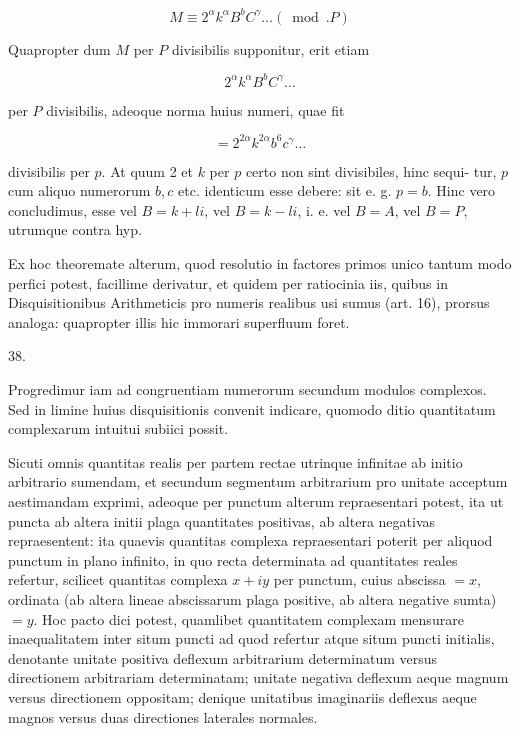 \documentclass[10pt]{article}
\begin{document}
\[
M \equiv 2^{\alpha} k^{\alpha} B^{b} C^{\gamma} \ldots(\bmod . P)
\]

Quapropter dum \(M\) per \(P\) divisibilis supponitur, erit etiam

\[
2^{\alpha} k^{\alpha} B^{b} C^{\gamma} \ldots
\]

per \(P\) divisibilis, adeoque norma huius numeri, quae fit

\[
=2^{2 \alpha} k^{2 \alpha} b^{6} c^{\gamma} \ldots
\]

divisibilis per \(p\). At quum 2 et \(k\) per \(p\) certo non sint divisibiles, hinc sequi-
tur, \(p\) cum aliquo numerorum \(b, c\) etc. identicum esse debere: sit e. g. \(p=b\). Hinc vero concludimus, esse vel \(B=k+l i\), vel \(B=k-l i\), i. e. vel \(B=A\), vel \(B=P\), utrumque contra hyp.

Ex hoc theoremate alterum, quod resolutio in factores primos unico tantum modo perfici potest, facillime derivatur, et quidem per ratiocinia iis, quibus in Disquisitionibus Arithmeticis pro numeris realibus usi sumus (art. 16), prorsus analoga: quapropter illis hic immorari superfluum foret.

38.

Progredimur iam ad congruentiam numerorum secundum modulos complexos. Sed in limine huius disquisitionis convenit indicare, quomodo ditio quantitatum complexarum intuitui subiici possit.

Sicuti omnis quantitas realis per partem rectae utrinque infinitae ab initio arbitrario sumendam, et secundum segmentum arbitrarium pro unitate acceptum aestimandam exprimi, adeoque per punctum alterum repraesentari potest, ita ut puncta ab altera initii plaga quantitates positivas, ab altera negativas repraesentent: ita quaevis quantitas complexa repraesentari poterit per aliquod punctum in plano infinito, in quo recta determinata ad quantitates reales refertur, scilicet quantitas complexa \(x+i y\) per punctum, cuius abscissa \(=x\), ordinata (ab altera lineae abscissarum plaga positive, ab altera negative sumta) \(=y\). Hoc pacto dici potest, quamlibet quantitatem complexam mensurare inaequalitatem inter situm puncti ad quod refertur atque situm puncti initialis, denotante unitate positiva deflexum arbitrarium determinatum versus directionem arbitrariam determinatam; unitate negativa deflexum aeque magnum versus directionem oppositam; denique unitatibus imaginariis deflexus aeque magnos versus duas directiones laterales normales.
\end{document}
